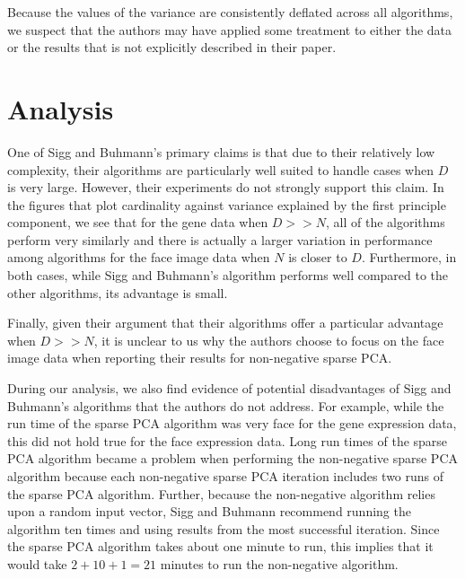 \documentclass{article}
\begin{document}
Because the values of the variance are consistently deflated
across all algorithms, we suspect that the authors may have
applied some treatment to either the data or the results
that is not explicitly described in their paper.




\section{Analysis}

One of Sigg and Buhmann's primary claims is that due to their
relatively low complexity, their algorithms are particularly
well suited to handle cases when $D$ is very large.
However, their experiments do not strongly support this claim.
In the figures that plot cardinality against variance
explained by the first principle component, we see that for the
gene data when $D >> N$, all of the algorithms perform very
similarly and there is actually a larger variation in performance
among algorithms for the face image data when $N$ is closer to $D$.
Furthermore, in both cases, while Sigg and Buhmann's algorithm
performs well compared to the other algorithms, its advantage is small.


Finally, given their argument that their algorithms offer a particular
advantage when $D >> N$, it is unclear to us why the authors choose
to focus on the face image data when reporting their results for
non-negative sparse PCA.

During our analysis, we also find evidence of potential disadvantages
of Sigg and Buhmann's algorithms that the authors do not address.
For example, while the run time of the sparse PCA algorithm was
very face for the gene expression data, this did not hold true for
the face expression data. Long run times of the sparse PCA algorithm
became a problem when performing the non-negative sparse PCA algorithm
because each non-negative sparse PCA iteration includes two runs
of the sparse PCA algorithm. Further, because the non-negative
algorithm relies upon a random input vector, Sigg and Buhmann
recommend running the algorithm ten times and using results from
the most successful iteration. Since the sparse PCA algorithm takes
about one minute to run, this implies that it would take $2+10+1=21$
minutes to run the non-negative algorithm.
\end{document}
